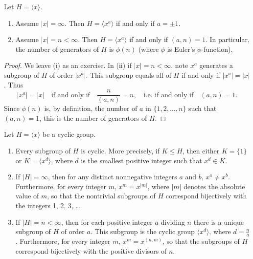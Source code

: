 \documentclass[11pt,a4paper]{article}
\begin{document}
\begin{prop}
    Let \( H = \langle x \rangle \).
    \begin{enumerate}[label=(\roman*)]
        \item Assume \( |x| = \infty \). Then \( H = \langle x^a \rangle \) if and only if \( a = \pm 1 \).
        \item Assume \( |x| = n < \infty \). Then \( H = \langle x^a \rangle \) if and only if \( (a, n) = 1 \). In particular, the number of generators of \( H \) is \( \phi(n) \) (where \( \phi \) is Euler's \(\phi\)-function).
    \end{enumerate}
\end{prop}

\begin{proof}
    We leave (i) as an exercise. In (ii) if \( |x| = n < \infty \), note  \( x^a \) generates a subgroup of \( H \) of order \( |x^a| \). This subgroup equals all of \( H \) if and only if \( |x^a| = |x| \). Thus
\[
|x^a| = |x| \quad \text{if and only if} \quad \frac{n}{(a, n)} = n, \quad \text{i.e. if and only if} \quad (a, n) = 1.
\]
Since \( \phi(n) \) is, by definition, the number of \( a \) in \( \{1, 2, \ldots, n\} \) such that \( (a, n) = 1 \), this is the number of generators of \( H \).

\end{proof}

\begin{teo}
    Let \( H = \langle x \rangle \) be a cyclic group.
\begin{enumerate}
    \item Every subgroup of \( H \) is cyclic. More precisely, if \( K \leq H \), then either \( K = \{1\} \) or \( K = \langle x^d \rangle \), where \( d \) is the smallest positive integer such that \( x^d \in K \).
    \item If \( |H| = \infty \), then for any distinct nonnegative integers \( a \) and \( b \), \( x^a \neq x^b \). Furthermore, for every integer \( m \), \( x^m = x^{|m|} \), where \( |m| \) denotes the absolute value of \( m \), so that the nontrivial subgroups of \( H \) correspond bijectively with the integers 1, 2, 3, \ldots.
    \item If \( |H| = n < \infty \), then for each positive integer \( a \) dividing \( n \) there is a unique subgroup of \( H \) of order \( a \). This subgroup is the cyclic group \( \langle x^d \rangle \), where \( d = \frac{n}{a} \). Furthermore, for every integer \( m \), \( x^m = x^{(n, m)} \), so that the subgroups of \( H \) correspond bijectively with the positive divisors of \( n \).
\end{enumerate}
\end{teo}
\end{document}
